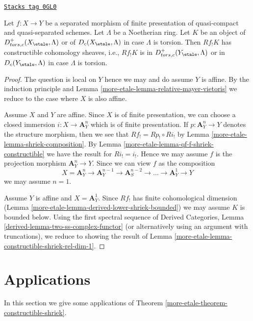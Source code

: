 \begin{theorem}
\label{more-etale-theorem-constructible-shriek}
\href{https://stacks.math.columbia.edu/tag/0GL0}{\texttt{Stacks tag 0GL0}}

Let $f : X \to Y$ be a separated morphism of finite presentation
of quasi-compact and quasi-separated schemes. Let $\Lambda$ be a
Noetherian ring. Let $K$ be an object of $D^+_{tors, c}(X_\etale, \Lambda)$
or of $D_c(X_\etale, \Lambda)$ in case $\Lambda$ is torsion.
Then $Rf_!K$ has constructible cohomology sheaves, i.e.,
$Rf_!K$ is in $D^+_{tors, c}(Y_\etale, \Lambda)$
or in $D_c(Y_\etale, \Lambda)$ in case $\Lambda$ is torsion.
\end{theorem}

\begin{proof}
The question is local on $Y$ hence we may and do assume $Y$ is affine.
By the induction principle and Lemma \ref{more-etale-lemma-relative-mayer-vietoris}
we reduce to the case where $X$ is also affine.

\medskip\noindent
Assume $X$ and $Y$ are affine. Since $X$ is of finite presentation,
we can choose a closed immersion $i : X \to \mathbf{A}^n_Y$ which is
of finite presentation. If $p : \mathbf{A}^n_Y \to Y$ denotes
the structure morphism, then we see that $Rf_! = Rp_! \circ Ri_!$
by Lemma \ref{more-etale-lemma-shriek-composition}. By
Lemma \ref{more-etale-lemma-qf-f-shriek-constructible}
we have the result for $Ri_! = i_!$. Hence we may assume $f$
is the projection morphism $\mathbf{A}^n_Y \to Y$.
Since we can view $f$ as the composition
$$
X = \mathbf{A}^n_Y \to \mathbf{A}^{n - 1}_Y \to
\mathbf{A}^{n - 2}_S \to \ldots \to
\mathbf{A}^1_Y \to Y
$$
we may assume $n = 1$.

\medskip\noindent
Assume $Y$ is affine and $X = \mathbf{A}^1_Y$. Since $Rf_!$ has
finite cohomological dimension
(Lemma \ref{more-etale-lemma-derived-lower-shriek-bounded})
we may assume $K$ is bounded below. Using the first spectral sequence of
Derived Categories, Lemma \ref{derived-lemma-two-ss-complex-functor}
(or alternatively using an argument with truncations),
we reduce to showing the result of
Lemma \ref{more-etale-lemma-constructible-shriek-rel-dim-1}.
\end{proof}

\section{Applications}
\label{more-etale-section-applications}
In this section we give some applications of
Theorem \ref{more-etale-theorem-constructible-shriek}.

